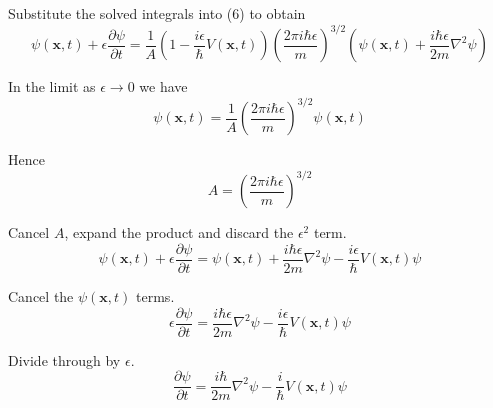 \documentclass[12pt]{article}
\begin{document}
Substitute the solved integrals into (6) to obtain
\begin{equation*}
\psi(\mathbf{x},t)+\epsilon\frac{\partial\psi}{\partial t}
=\frac{1}{A}
\left(1-\frac{i\epsilon}{\hbar}V\left(\mathbf x,t\right)\right)
\left(\frac{2\pi i\hbar\epsilon}{m}\right)^{3/2}
\left(
\psi(\mathbf x,t)+\frac{i\hbar\epsilon}{2m}\nabla^2\psi
\right)
\end{equation*}

In the limit as $\epsilon\rightarrow0$ we have
\begin{equation*}
\psi(\mathbf{x},t)=\frac{1}{A}\left(\frac{2\pi i\hbar\epsilon}{m}\right)^{3/2}\psi(\mathbf x,t)
\end{equation*}

Hence
\begin{equation*}
A=\left(\frac{2\pi i\hbar\epsilon}{m}\right)^{3/2}
\end{equation*}

Cancel $A$, expand the product and discard the $\epsilon^2$ term.
\begin{equation*}
\psi(\mathbf{x},t)+\epsilon\frac{\partial\psi}{\partial t}
=\psi(\mathbf{x},t)
+\frac{i\hbar\epsilon}{2m}\nabla^2\psi
-\frac{i\epsilon}{\hbar}V(\mathbf x,t)\psi
\end{equation*}

Cancel the $\psi(\mathbf x,t)$ terms.
\begin{equation*}
\epsilon\frac{\partial\psi}{\partial t}
=\frac{i\hbar\epsilon}{2m}\nabla^2\psi
-\frac{i\epsilon}{\hbar}V(\mathbf x,t)\psi
\end{equation*}

Divide through by $\epsilon$.
\begin{equation*}
\frac{\partial\psi}{\partial t}
=\frac{i\hbar}{2m}\nabla^2\psi
-\frac{i}{\hbar}V(\mathbf x,t)\psi
\tag{16}
\end{equation*}
\end{document}
